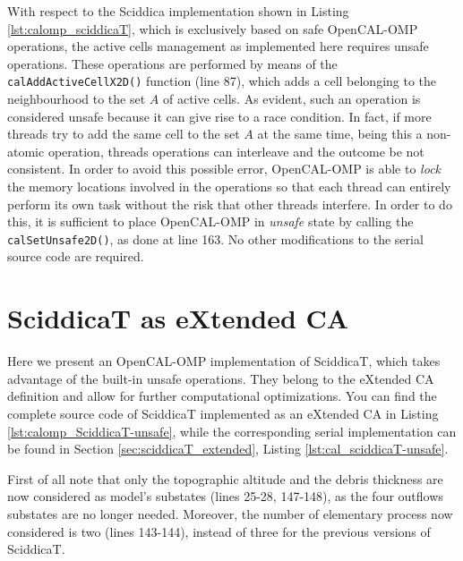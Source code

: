 

With respect to the Sciddica implementation shown in Listing
\ref{lst:calomp_sciddicaT}, which is exclusively based on safe
OpenCAL-OMP operations, the active cells management as implemented
here requires unsafe operations. These operations are performed by
means of the \verb'calAddActiveCellX2D()' function (line 87), which
adds a cell belonging to the neighbourhood to the set $A$ of active
cells. As evident, such an operation is considered unsafe because it
can give rise to a race condition. In fact, if more threads try to add
the same cell to the set $A$ at the same time, being this a non-atomic
operation, threads operations can interleave and the outcome be not
consistent. In order to avoid this possible error, OpenCAL-OMP is able
to \emph{lock} the memory locations involved in the operations so that
each thread can entirely perform its own task without the risk that
other threads interfere. In order to do this, it is sufficient to
place OpenCAL-OMP in \emph{unsafe} state by calling the
\verb'calSetUnsafe2D()', as done at line 163. No other modifications
to the serial source code are required.

\section{SciddicaT as eXtended CA}
Here we present an OpenCAL-OMP implementation of SciddicaT, which takes
advantage of the built-in unsafe operations. They belong to the
eXtended CA definition and allow for further computational
optimizations. You can find the complete source code of SciddicaT
implemented as an eXtended CA in Listing
\ref{lst:calomp_SciddicaT-unsafe}, while the corresponding serial
implementation can be found in Section \ref{sec:sciddicaT_extended},
Listing \ref{lst:cal_sciddicaT-unsafe}.



First of all note that only the topographic altitude and the debris
thickness are now considered as model's substates (lines 25-28,
147-148), as the four outflows substates are no longer
needed. Moreover, the number of elementary process now considered is
two (lines 143-144), instead of three for the previous versions of
SciddicaT.


